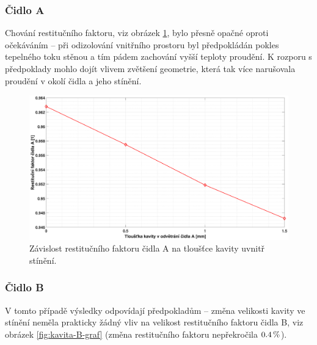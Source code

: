         \subsubsection{Čidlo A}
            Chování restitučního faktoru, viz obrázek \ref{fig:kavita-A-graf}, bylo přesně opačné oproti očekáváním – při odizolování vnitřního prostoru byl předpokládán pokles tepelného toku stěnou a tím pádem zachování vyšší teploty proudění. K rozporu s předpoklady mohlo dojít vlivem zvětšení geometrie, která tak více narušovala proudění v okolí čidla a jeho stínění.
            \begin{figure}[ht!]
                \centering
                \includegraphics*[width=\textwidth, trim={5.25cm 1.0cm 5.8cm 2.0cm}]{400_SIMULACE_KONSTRUKCNICH_UPRAV/Grafy/kavita.eps}
                \caption{Závislost restitučního faktoru čidla A na tloušťce kavity uvnitř stínění.}
                \label{fig:kavita-A-graf}
            \end{figure}
        
        \newpage
        
        \subsubsection{Čidlo B}
            V tomto případě výsledky odpovídají předpokladům – změna velikosti kavity ve stínění neměla prakticky žádný vliv na velikost restitučního faktoru čidla B, viz obrázek \ref{fig:kavita-B-graf} (změna restitučního faktoru nepřekročila $0.4 \, \%$).
        

